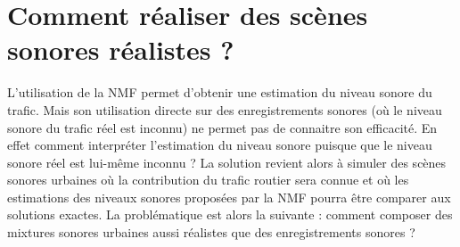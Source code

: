 %
%
%	
%
%
%

\chapter{Comment réaliser des scènes sonores réalistes ?}

L'utilisation de la NMF permet d'obtenir une estimation du niveau sonore du trafic. Mais son utilisation directe sur des enregistrements sonores (où le niveau sonore du trafic réel est inconnu) ne permet pas de connaitre son efficacité. En effet comment interpréter l'estimation du niveau sonore puisque que le niveau sonore réel est lui-même inconnu ?  La solution revient alors à simuler des scènes sonores urbaines où la contribution du trafic routier sera connue et où les estimations des niveaux sonores proposées par la NMF pourra être comparer aux solutions exactes. La problématique est alors la suivante : comment composer des mixtures sonores urbaines aussi réalistes que des enregistrements sonores ?  \\

%
%

